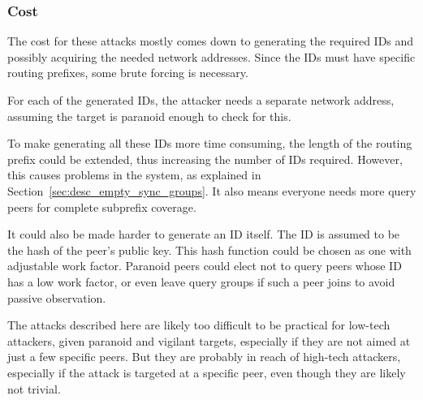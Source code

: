 \subsubsection{Cost}
The cost for these attacks mostly comes down to generating the required IDs and
possibly acquiring the needed network addresses. Since the IDs must have
specific routing prefixes, some brute forcing is necessary.

For each of the generated IDs, the attacker needs a separate network address,
assuming the target is paranoid enough to check for this.

To make generating all these IDs more time consuming, the length of the routing
prefix could be extended, thus increasing the number of IDs required. However,
this causes problems in the system, as explained in
Section~\ref{sec:desc_empty_sync_groups}. It also means everyone needs more
query peers for complete subprefix coverage.

It could also be made harder to generate an ID itself. The ID is assumed to be
the hash of the peer's public key. This hash function could be chosen as one
with adjustable work factor. Paranoid peers could elect not to query peers whose
ID has a low work factor, or even leave query groups if such a peer joins to
avoid passive observation.

The attacks described here are likely too difficult to be practical for low-tech
attackers, given paranoid and vigilant targets, especially if they are not aimed
at just a few specific peers. But they are probably in reach of high-tech
attackers, especially if the attack is targeted at a specific peer, even though
they are likely not trivial.
